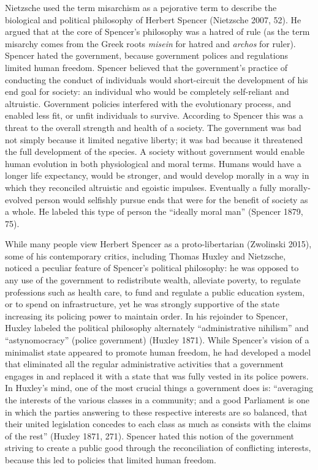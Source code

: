 \documentclass[12pt,]{article}
\begin{document}
Nietzsche used the term misarchism as a pejorative term to describe the
biological and political philosophy of Herbert Spencer (Nietzsche 2007,
52). He argued that at the core of Spencer's philosophy was a hatred of
rule (as the term misarchy comes from the Greek roots \emph{misein} for
hatred and \emph{archos} for ruler). Spencer hated the government,
because government polices and regulations limited human freedom.
Spencer believed that the government's practice of conducting the
conduct of individuals would short-circuit the development of his end
goal for society: an individual who would be completely self-reliant and
altruistic. Government policies interfered with the evolutionary
process, and enabled less fit, or unfit individuals to survive.
According to Spencer this was a threat to the overall strength and
health of a society. The government was bad not simply because it
limited negative liberty; it was bad because it threatened the full
development of the species. A society without government would enable
human evolution in both physiological and moral terms. Humans would have
a longer life expectancy, would be stronger, and would develop morally
in a way in which they reconciled altruistic and egoistic impulses.
Eventually a fully morally-evolved person would selfishly pursue ends
that were for the benefit of society as a whole. He labeled this type of
person the ``ideally moral man'' (Spencer 1879, 75).

While many people view Herbert Spencer as a proto-libertarian (Zwolinski
2015), some of his contemporary critics, including Thomas Huxley and
Nietzsche, noticed a peculiar feature of Spencer's political philosophy:
he was opposed to any use of the government to redistribute wealth,
alleviate poverty, to regulate professions such as health care, to fund
and regulate a public education system, or to spend on infrastructure,
yet he was strongly supportive of the state increasing its policing
power to maintain order. In his rejoinder to Spencer, Huxley labeled the
political philosophy alternately ``administrative nihilism'' and
``astynomocracy'' (police government) (Huxley 1871). While Spencer's
vision of a minimalist state appeared to promote human freedom, he had
developed a model that eliminated all the regular administrative
activities that a government engages in and replaced it with a state
that was fully vested in its police powers. In Huxley's mind, one of the
most crucial things a government does is: ``averaging the interests of
the various classes in a community; and a good Parliament is one in
which the parties answering to these respective interests are so
balanced, that their united legislation concedes to each class as much
as consists with the claims of the rest'' (Huxley 1871, 271). Spencer
hated this notion of the government striving to create a public good
through the reconciliation of conflicting interests, because this led to
policies that limited human freedom.
\end{document}
